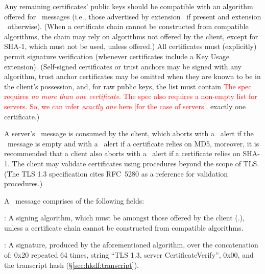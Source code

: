 \begin{description}
{  }
  \fi
  Any remaining certificates' public keys should be compatible with an algorithm 
  offered %
  for \Certificate\ messages (i.e., those advertised 
  by extension \TLSsignatureAlgorithmsCert\ if present and extension 
  \TLSsignatureAlgorithms\ otherwise).
  (When a certificate chain cannot be constructed from compatible algorithms, 
  the chain may rely on algorithms not offered by the client, 
  except for SHA-1, which must not be used, unless offered.)
  All certificates must (explicitly) permit signature verification (whenever
  certificates include a Key Usage extension).
  (Self-signed certificates or trust anchors may be signed 
  with any algorithm, trust anchor certificates 
  may be omitted when they are known to be in the client's 
  possession, and, for raw public keys, the list must contain 
  \ifSpecNotes 
  \textcolor{red}{
  The spec requires \emph{no more than one certificate}.
  The spec also requires a non-empty list for servers. 
  So, we can infer \emph{exactly one} here [for the case of servers].
  }
  \fi
  exactly one certificate.)

\end{description}

\noindent
A server's \Certificate\ message is consumed by the client, which aborts
with a \TLSdecodeError\ alert if the \Certificate\ message is empty
and with a \TLSbadCertificate\ alert if a certificate relies on MD5, moreover,
it is recommended that a client also aborts with a \TLSbadCertificate\ alert if
a certificate relies on SHA-1. The client may validate certificates using 
procedures beyond the scope of TLS. (The TLS 1.3 specification
cites RFC~5280 as a reference for validation procedures.)

A \CertificateVerify\ message comprises of the following fields:

\begin{description}

\begin{sloppypar}
\item \TLSalgorithm: A signing algorithm, which must be amongst those
  offered by the client (\ClientHello.\TLSsignatureAlgorithms), unless 
  a certificate chain cannot be constructed from compatible algorithms.
\end{sloppypar}
  
\item \TLSsignature: A signature, produced by the aforementioned algorithm, over the concatenation of: 
  0x20 repeated 64 times, string ``TLS 1.3, server CertificateVerify'',
  0x00, and the transcript hash (\S\ref{sec:hkdf:transcript}).

\end{description}

